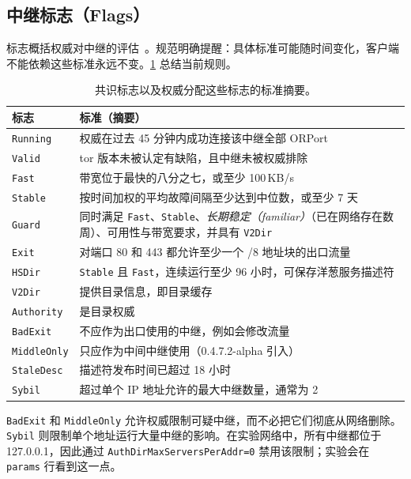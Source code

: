 \subsection{中继标志（Flags）}\label{sec:dir-flag}

标志概括权威对中继的评估~。规范明确提醒：具体标准可能随时间变化，客户端不能依赖这些标准永远不变。\cref{tab:flag} 总结当前规则。

\begin{table}[htbp]
\centering\small
\begin{tabularx}{\textwidth}{@{}l>{\raggedright\arraybackslash}X@{}}
\toprule
标志 & 标准（摘要） \\
\midrule
\texttt{Running} & 权威在过去 45 分钟内成功连接该中继全部 ORPort \\
\texttt{Valid} & tor 版本未被认定有缺陷，且中继未被权威排除 \\
\texttt{Fast} & 带宽位于最快的八分之七，或至少 100\,KB/s \\
\texttt{Stable} & 按时间加权的平均故障间隔至少达到中位数，或至少 7 天 \\
\texttt{Guard} & 同时满足 \texttt{Fast}、\texttt{Stable}、\emph{长期稳定（familiar）}（已在网络存在数周）、可用性与带宽要求，并具有 \texttt{V2Dir} \\
\texttt{Exit} & 对端口 80 和 443 都允许至少一个 /8 地址块的出口流量 \\
\texttt{HSDir} & \texttt{Stable} 且 \texttt{Fast}，连续运行至少 96 小时，可保存洋葱服务描述符 \\
\texttt{V2Dir} & 提供目录信息，即目录缓存 \\
\texttt{Authority} & 是目录权威 \\
\texttt{BadExit} & 不应作为出口使用的中继，例如会修改流量 \\
\texttt{MiddleOnly} & 只应作为中间中继使用（0.4.7.2-alpha 引入） \\
\texttt{StaleDesc} & 描述符发布时间已超过 18 小时 \\
\texttt{Sybil} & 超过单个 IP 地址允许的最大中继数量，通常为 2 \\
\bottomrule
\end{tabularx}
\caption{共识标志以及权威分配这些标志的标准摘要。}
\label{tab:flag}
\end{table}

\texttt{BadExit} 和 \texttt{MiddleOnly} 允许权威限制可疑中继，而不必把它们彻底从网络删除。\texttt{Sybil} 则限制单个地址运行大量中继的影响。在实验网络中，所有中继都位于 127.0.0.1，因此通过 \texttt{AuthDirMaxServersPerAddr=0} 禁用该限制；实验会在 \texttt{params} 行看到这一点。

